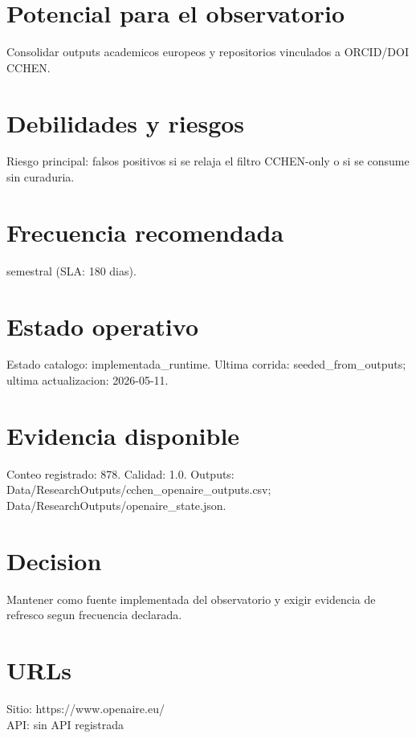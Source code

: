 \documentclass[10pt,a4paper]{article}
\begin{document}
\section*{Potencial para el observatorio}
Consolidar outputs academicos europeos y repositorios vinculados a ORCID/DOI CCHEN.

\section*{Debilidades y riesgos}
Riesgo principal: falsos positivos si se relaja el filtro CCHEN-only o si se consume sin curaduria.

\section*{Frecuencia recomendada}
semestral (SLA: 180 dias).

\section*{Estado operativo}
Estado catalogo: implementada\_runtime. Ultima corrida: seeded\_from\_outputs; ultima actualizacion: 2026-05-11.

\section*{Evidencia disponible}
Conteo registrado: 878. Calidad: 1.0. Outputs: Data/ResearchOutputs/cchen\_openaire\_outputs.csv; Data/ResearchOutputs/openaire\_state.json.

\section*{Decision}
Mantener como fuente implementada del observatorio y exigir evidencia de refresco segun frecuencia declarada.


\section*{URLs}
Sitio: https://www.openaire.eu/\\
API: sin API registrada
\end{document}
